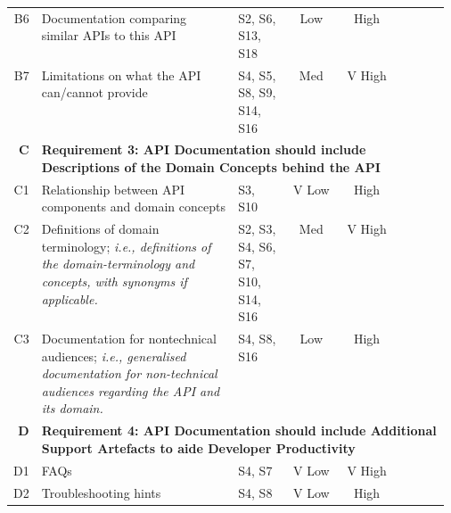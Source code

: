 \begin{landscape}
{\begin{longtable}{rp{0.45\linewidth}|p{0.125\linewidth}|cc|ccc}
  B6&
  Documentation comparing similar APIs to this API
  &
  \scriptsize S2, S6, S13, S18 &
  \cellcolor[HTML]{f6b26b}Low&\cellcolor[HTML]{a7c47d}High&\circlepartialpresent{}&\circlenotpresent{}&\circlepresent{}\\


  B7&
  Limitations on what the API can/cannot provide
  &
  \scriptsize S4, S5, S8, S9, S14, S16 &
  \cellcolor[HTML]{ffd666}Med&\cellcolor[HTML]{57bb8a}V High&\circlenotpresent{}&\circlepresent{}&\circlepresent{}\\

  \midrule
  \textbf{C}&
  \multicolumn{7}{l}{\textbf{Requirement 3: API Documentation should include Descriptions of the Domain Concepts behind the API}}\\
  \midrule
  
  C1&
  Relationship between API components and domain concepts
  &
  \scriptsize S3, S10 &
  \cellcolor[HTML]{e67c73}V Low&\cellcolor[HTML]{a7c47d}High&\circlenotpresent{}&\circlenotpresent{}&\circlepresent{}\\

  C2&
  Definitions of domain terminology; \textit{i.e., definitions of the domain-terminology and concepts, with synonyms if applicable.}
  &
  \scriptsize S2, S3, S4, S6, S7, S10, S14, S16 &
  \cellcolor[HTML]{ffd666}Med&\cellcolor[HTML]{57bb8a}V High&\circlepartialpresent{}&\circlenotpresent{}&\circlepartialpresent{}\\

  C3&
  Documentation for nontechnical audiences; \textit{i.e., generalised documentation for non-technical audiences regarding the API and its domain.}
  &
  \scriptsize S4, S8, S16 &
  \cellcolor[HTML]{f6b26b}Low&\cellcolor[HTML]{a7c47d}High&\circlepresent{}&\circlepresent{}&\circlepresent{}\\

  \midrule
  \textbf{D}&
  \multicolumn{7}{l}{\textbf{Requirement 4: API Documentation should include Additional Support Artefacts to aide Developer Productivity}}\\
  \midrule
  
  D1&
  FAQs
  &
  \scriptsize S4, S7 &
  \cellcolor[HTML]{e67c73}V Low&\cellcolor[HTML]{57bb8a}V High&\circlepresent{}&\circlepresent{}&\circlepresent{}\\

  D2&
  Troubleshooting hints
  &
  \scriptsize S4, S8 &
  \cellcolor[HTML]{e67c73}V Low&\cellcolor[HTML]{a7c47d}High&\circlenotpresent{}&\circlepartialpresent{}&\circlenotpresent{}\\


\end{longtable}}
\end{landscape}
